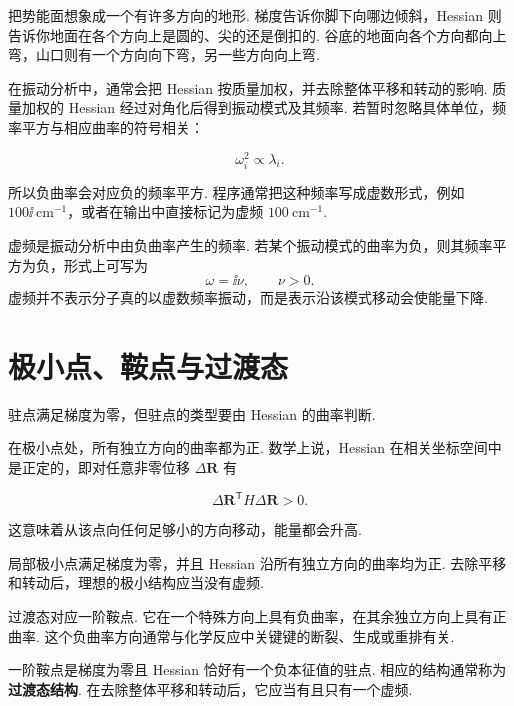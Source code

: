 \documentclass[UTF8,11pt,a4paper,openany]{ctexbook}
\newcommand{\term}[1]{\textbf{#1}}
\begin{document}
\begin{analogybox}
把势能面想象成一个有许多方向的地形. 梯度告诉你脚下向哪边倾斜，Hessian 则告诉你地面在各个方向上是圆的、尖的还是倒扣的. 谷底的地面向各个方向都向上弯，山口则有一个方向向下弯，另一些方向向上弯. 
\end{analogybox}

在振动分析中，通常会把 Hessian 按质量加权，并去除整体平移和转动的影响. 质量加权的 Hessian 经过对角化后得到振动模式及其频率. 若暂时忽略具体单位，频率平方与相应曲率的符号相关：

\[
\omega_i^2\propto\lambda_i.
\]

所以负曲率会对应负的频率平方. 程序通常把这种频率写成虚数形式，例如 $100\ii\ \mathrm{cm}^{-1}$，或者在输出中直接标记为虚频 $100\ \mathrm{cm}^{-1}$. 

\begin{definitionbox}
虚频是振动分析中由负曲率产生的频率. 若某个振动模式的曲率为负，则其频率平方为负，形式上可写为
\[
\omega=\ii\nu,
\qquad \nu>0.
\]
虚频并不表示分子真的以虚数频率振动，而是表示沿该模式移动会使能量下降. 
\end{definitionbox}

\section{极小点、鞍点与过渡态}

驻点满足梯度为零，但驻点的类型要由 Hessian 的曲率判断. 

在极小点处，所有独立方向的曲率都为正. 数学上说，Hessian 在相关坐标空间中是正定的，即对任意非零位移 $\Delta\mathbf R$ 有

\[
\Delta\mathbf R^{\mathsf T}H\Delta\mathbf R>0.
\]

这意味着从该点向任何足够小的方向移动，能量都会升高. 

\begin{definitionbox}
局部极小点满足梯度为零，并且 Hessian 沿所有独立方向的曲率均为正. 去除平移和转动后，理想的极小结构应当没有虚频. 
\end{definitionbox}

过渡态对应一阶鞍点. 它在一个特殊方向上具有负曲率，在其余独立方向上具有正曲率. 这个负曲率方向通常与化学反应中关键键的断裂、生成或重排有关. 

\begin{definitionbox}
一阶鞍点是梯度为零且 Hessian 恰好有一个负本征值的驻点. 相应的结构通常称为\term{过渡态结构}. 在去除整体平移和转动后，它应当有且只有一个虚频. 
\end{definitionbox}
\end{document}
